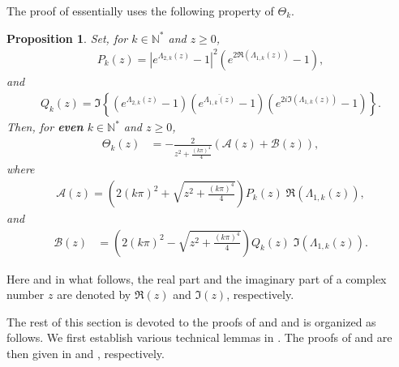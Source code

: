 \documentclass[11pt, reqno]{amsart}
\theoremstyle{plain}
\newtheorem{proposition}[thm]{Proposition}
\numberwithin{equation}{section}
\newcommand{\mN}{\mathbb{N}}
\begin{document}
\medskip 
The proof of  essentially uses the following property of $\Theta_k$.

\begin{proposition} \label{prop-Theta} Set, for $k \in \mN^*$ and $z \geq 0$,
\begin{align} 	\label{def-Pk}
P_k (z) = \left|e^{\Lambda_{2,k}(z)} - 1 \right|^2 \left(e^{2\Re (\Lambda_{1,k}(z))} - 1 \right),   
\end{align}
and 
\begin{align}	\label{def-Qk}
Q_k (z) = \Im \left\{ \left(e^{\Lambda_{2,k}(z)} - 1 \right) \left( e^{\overline{\Lambda_{1,k}(z)}} - 1 \right) \left(e^{2 i \Im (\Lambda_{1,k}(z))} - 1 \right) \right\}. 
\end{align}
Then, for {\bf even} $k \in \mN^*$ and $z \geq 0$,
\begin{align}
\Theta_k(z) &=  - \frac{2}{z^2 + \frac{(k \pi)^4}{4}} \left(\mathcal{A}(z) + \mathcal{B}(z) \right),
\end{align}
where
\begin{align}	\label{A(z)}
    \mathcal{A}(z) = \left(2 (k \pi)^2  + \sqrt{z^2 + \frac{(k \pi)^4}{4}}  \right)  P_k (z) \;\Re (\Lambda_{1,k}(z)), 
\end{align}
and
\begin{align}	\label{B(z)}
    \mathcal{B}(z) &= \left(2 (k \pi)^2  - \sqrt{z^2 + \frac{(k \pi)^4 }{4}} \right)  Q_k(z)  \; \Im (\Lambda_{1,k}(z)). 
\end{align} 
\end{proposition}
Here and in what follows, the real part and the imaginary part of a complex number $z$ are denoted by $\Re(z)$ and $\Im(z)$, respectively.

\medskip



The rest of this section is devoted to the proofs of  and  and is organized as follows. We first establish various technical lemmas in . The proofs of  and  are then given in  and , respectively.  
\end{document}
